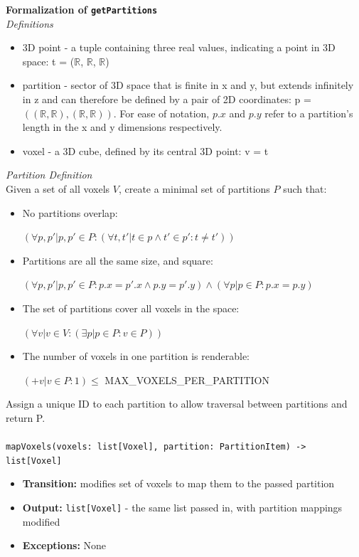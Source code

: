 \documentclass[12pt, titlepage]{article}
\begin{document}
\noindent \textbf{Formalization of \texttt{getPartitions}}\\
\textit{Definitions}
\begin{itemize}
  \item 3D point - a tuple containing three real values, indicating a point in 3D space: t = ($\mathbb{R}$, $\mathbb{R}$, $\mathbb{R}$)
  \item partition - sector of 3D space that is finite in x and y, but extends infinitely in z and can therefore be defined by a pair of 2D coordinates: p = $((\mathbb{R}, \mathbb{R}), (\mathbb{R}, \mathbb{R}))$. For ease of notation, $p.x$ and $p.y$ refer to a partition's length in the x and y dimensions respectively.
  \item voxel - a 3D cube, defined by its central 3D point: v = t
\end{itemize}
\textit{Partition Definition}\\
Given a set of all voxels $V$, create a minimal set of partitions $P$ such that:
\begin{itemize}
  \item No partitions overlap:
  \begin{center}
  $(\forall p, p' | p, p' \in P: (\forall t, t' | t \in p \land t' \in p': t \neq t'))$
  \end{center}
  \item Partitions are all the same size, and square:
  \begin{center}
  $(\forall p, p' | p, p' \in P: p.x = p'.x \land p.y = p'.y) \land (\forall p | p \in P: p.x = p.y)$
  \end{center}
  \item The set of partitions cover all voxels in the space:
  \begin{center}
  $(\forall v | v \in V: (\exists p | p \in P: v \in P))$
  \end{center}
  \item The number of voxels in one partition is renderable:
  \begin{center}
  $(+v | v \in P: 1) \leq$ MAX\_VOXELS\_PER\_PARTITION
  \end{center}
\end{itemize}
\noindent Assign a unique ID to each partition to allow traversal between partitions and return P.
\\\\
\noindent \texttt{mapVoxels(voxels: list[Voxel], partition: PartitionItem) -> list[Voxel]}
\begin{itemize}
  \item \textbf{Transition:} modifies set of voxels to map them to the passed partition
  \item \textbf{Output:} \texttt{list[Voxel]} - the same list passed in, with partition mappings modified
  \item \textbf{Exceptions:} None
\end{itemize}
\end{document}
